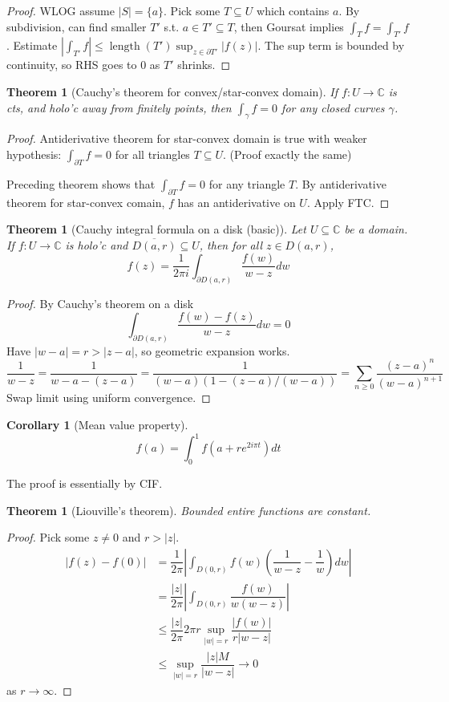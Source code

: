\documentclass{article}
\theoremstyle{definition}
\theoremstyle{remark}
\theoremstyle{plain}
\newtheorem{thm}[defn]{Theorem}
\newtheorem{crly}[defn]{Corollary}
\newcommand{\CC}{\mathbb{C}}
\begin{document}
\begin{proof}
WLOG assume $|S|=\{a\}$.
    Pick some $T\subseteq U$ which contains $a$. By subdivision, can find smaller $T'$ s.t. $a\in T'\subseteq T$, then Goursat implies  $\int_T f=\int_{T'}f$. Estimate $|\int_{T'}f|\le \operatorname{length}(T')\sup_{z\in\partial T'}|f(z)|$. The sup term is bounded by continuity, so RHS goes to $0$ as $T'$ shrinks.
\end{proof}
\begin{thm}[Cauchy's theorem for convex/star-convex domain]
    If $f:U\to\CC$ is cts, and holo'c away from finitely points, then $\int_\gamma f=0$ for any closed curves $\gamma$.
\end{thm}
\begin{proof}
    Antiderivative theorem for star-convex domain is true with weaker hypothesis: $\int_{\partial T}f=0$ for all triangles $T\subseteq U$. (Proof exactly the same)

    Preceding theorem shows that $\int_{\partial T}f=0$ for any triangle $T$. By antiderivative theorem for star-convex comain, $f$ has an antiderivative on $U$. Apply FTC.
\end{proof}
\begin{thm}[Cauchy integral formula on a disk (basic)]
   Let $U\subseteq\CC$ be a domain. If $f:U\to\CC$ is holo'c and $\overline{D(a,r)}\subseteq U$, then for all $z\in D(a,r)$,
   \[f(z)=\dfrac{1}{2\pi i}\int_{\partial D(a,r)}\dfrac{f(w)}{w-z}dw\]
\end{thm}
\begin{proof}
By Cauchy's theorem on a disk
    \[\int_{\partial D(a,r)}\dfrac{f(w)-f(z)}{w-z}dw=0\]
Have $|w-a|=r>|z-a|$, so geometric expansion works.
\[\dfrac{1}{w-z}=\dfrac{1}{w-a-(z-a)}=\dfrac{1}{(w-a)(1-(z-a)/(w-a))}=\sum_{n\ge 0}\dfrac{(z-a)^n}{(w-a)^{n+1}}\]
Swap limit using uniform convergence.
\end{proof}
\begin{crly}[Mean value property]
    \[f(a)=\int_0^1f(a+re^{2i\pi t})dt\]
\end{crly}
The proof is essentially by CIF.
\begin{thm}[Liouville's theorem]
    Bounded entire functions are constant.
\end{thm}
\begin{proof}
Pick some $z\neq 0$ and $r>|z|$.
    \begin{align*}
        |f(z)-f(0)|&=\dfrac{1}{2\pi}\left|\int_{D(0,r)}f(w)\left(\dfrac{1}{w-z}-\dfrac{1}{w}\right)dw\right|\\
        &=\dfrac{|z|}{2\pi}\left|\int_{D(0,r)}\dfrac{f(w)}{w(w-z)}\right|\\
        &\le \dfrac{|z|}{2\pi}2\pi r\sup_{|w|=r}\dfrac{|f(w)|}{r|w-z|}\\
        &\le \sup_{|w|=r}\dfrac{|z|M}{|w-z|}\to 0
    \end{align*} as $r\to\infty$.
\end{proof}
\end{document}
